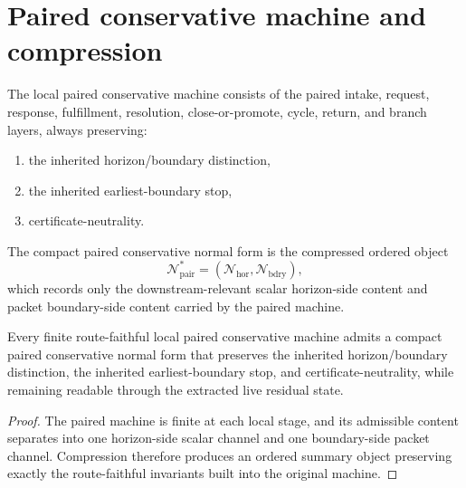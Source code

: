 \section{Paired conservative machine and compression}
\begin{definition}\label{def:paired-machine}
The local paired conservative machine consists of the paired intake, request, response, fulfillment, resolution, close-or-promote, cycle, return, and branch layers, always preserving:
\begin{enumerate}[leftmargin=2em]
  \item the inherited horizon/boundary distinction,
  \item the inherited earliest-boundary stop,
  \item certificate-neutrality.
\end{enumerate}
\end{definition}

\begin{definition}\label{def:compact-normal-form}
The compact paired conservative normal form is the compressed ordered object
\[
\mathcal{N}^{\ast}_{\mathrm{pair}}=(\mathcal{N}_{\mathrm{hor}},\mathcal{N}_{\mathrm{bdry}}),
\]
which records only the downstream-relevant scalar horizon-side content and packet boundary-side content carried by the paired machine.
\end{definition}

\begin{theorem}\label{thm:compression-invariant-control}
Every finite route-faithful local paired conservative machine admits a compact paired conservative normal form that preserves the inherited horizon/boundary distinction, the inherited earliest-boundary stop, and certificate-neutrality, while remaining readable through the extracted live residual state.
\end{theorem}

\begin{proof}
The paired machine is finite at each local stage, and its admissible content separates into one horizon-side scalar channel and one boundary-side packet channel. Compression therefore produces an ordered summary object preserving exactly the route-faithful invariants built into the original machine.
\end{proof}

